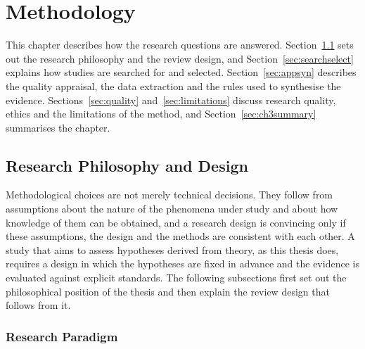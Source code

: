 %

\chapter{Methodology}
\label{ch:method}

This chapter describes how the research questions are answered. Section~\ref{sec:philosophy} sets out the research philosophy and the review design, and Section~\ref{sec:searchselect} explains how studies are searched for and selected. Section~\ref{sec:appsyn} describes the quality appraisal, the data extraction and the rules used to synthesise the evidence. Sections~\ref{sec:quality} and~\ref{sec:limitations} discuss research quality, ethics and the limitations of the method, and Section~\ref{sec:ch3summary} summarises the chapter.

\section{Research Philosophy and Design}
\label{sec:philosophy}

Methodological choices are not merely technical decisions. They follow from assumptions about the nature of the phenomena under study and about how knowledge of them can be obtained, and a research design is convincing only if these assumptions, the design and the methods are consistent with each other. A study that aims to assess hypotheses derived from theory, as this thesis does, requires a design in which the hypotheses are fixed in advance and the evidence is evaluated against explicit standards. The following subsections first set out the philosophical position of the thesis and then explain the review design that follows from it.

\subsection{Research Paradigm}
\label{sec:paradigm}

